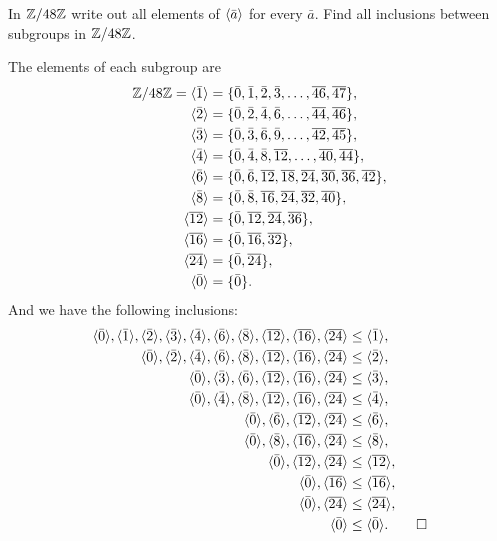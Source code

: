  In $\mathbb{Z}/48\mathbb{Z}$ write out all elements of $\langle{\bar{a}}\rangle$ for
every $\bar a$. Find all inclusions between subgroups in $\mathbb{Z}/48\mathbb{Z}$.
\begin{solution}
  The elements of each subgroup are
  \begin{align*}
    \mathbb{Z}/48\mathbb{Z} = \langle{\bar1}\rangle
    &= \{\bar0, \bar1, \bar2, \bar3, \dots, \overline{46},
      \overline{47}\}, \\
    \langle{\bar2}\rangle &= \{\bar0, \bar2, \bar4, \bar6, \dots,
                  \overline{44}, \overline{46}\}, \\
    \langle{\bar3}\rangle &= \{\bar0, \bar3, \bar6, \bar9, \dots,
                  \overline{42}, \overline{45}\}, \\
    \langle{\bar4}\rangle &= \{\bar0, \bar4, \bar8, \overline{12}, \dots,
                  \overline{40}, \overline{44}\}, \\
    \langle{\bar6}\rangle &= \{\bar0, \bar6, \overline{12}, \overline{18},
                  \overline{24}, \overline{30}, \overline{36},
                  \overline{42}\}, \\
    \langle{\bar8}\rangle &= \{\bar0, \bar8, \overline{16}, \overline{24},
                  \overline{32}, \overline{40}\}, \\
    \langle{\overline{12}}\rangle &= \{\bar0, \overline{12}, \overline{24},
                          \overline{36}\}, \\
    \langle{\overline{16}}\rangle &= \{\bar0, \overline{16}, \overline{32}\}, \\
    \langle{\overline{24}}\rangle &= \{\bar0, \overline{24}\}, \\
    \langle{\bar0}\rangle &= \{\bar0\}.
  \end{align*}
  And we have the following inclusions:
  \begin{align*}
    \langle{\bar0}\rangle, \langle{\bar1}\rangle, \langle{\bar2}\rangle, \langle{\bar3}\rangle, \langle{\bar4}\rangle,
    \langle{\bar6}\rangle, \langle{\bar8}\rangle, \langle{\overline{12}}\rangle, \langle{\overline{16}}\rangle,
    \langle{\overline{24}}\rangle
    &\leq \langle{\bar1}\rangle, \\
    \langle{\bar0}\rangle, \langle{\bar2}\rangle, \langle{\bar4}\rangle, \langle{\bar6}\rangle, \langle{\bar8}\rangle,
    \langle{\overline{12}}\rangle, \langle{\overline{16}}\rangle, \langle{\overline{24}}\rangle
    &\leq \langle{\bar2}\rangle, \\
    \langle{\bar0}\rangle, \langle{\bar3}\rangle, \langle{\bar6}\rangle, \langle{\overline{12}}\rangle,
    \langle{\overline{16}}\rangle, \langle{\overline{24}}\rangle
    &\leq \langle{\bar3}\rangle, \\
    \langle{\bar0}\rangle, \langle{\bar4}\rangle, \langle{\bar8}\rangle, \langle{\overline{12}}\rangle,
    \langle{\overline{16}}\rangle, \langle{\overline{24}}\rangle
    &\leq \langle{\bar4}\rangle, \\
    \langle{\bar0}\rangle, \langle{\bar6}\rangle, \langle{\overline{12}}\rangle, \langle{\overline{24}}\rangle
    &\leq \langle{\bar6}\rangle, \\
    \langle{\bar0}\rangle, \langle{\bar8}\rangle, \langle{\overline{16}}\rangle, \langle{\overline{24}}\rangle
    &\leq \langle{\bar8}\rangle, \\
    \langle{\bar0}\rangle, \langle{\overline{12}}\rangle, \langle{\overline{24}}\rangle
    &\leq \langle{\overline{12}}\rangle, \\
    \langle{\bar0}\rangle, \langle{\overline{16}}\rangle &\leq \langle{\overline{16}}\rangle, \\
    \langle{\bar0}\rangle, \langle{\overline{24}}\rangle &\leq \langle{\overline{24}}\rangle, \\
    \langle{\bar0}\rangle &\leq \langle{\bar0}\rangle. \qedhere
  \end{align*}
\end{solution}

